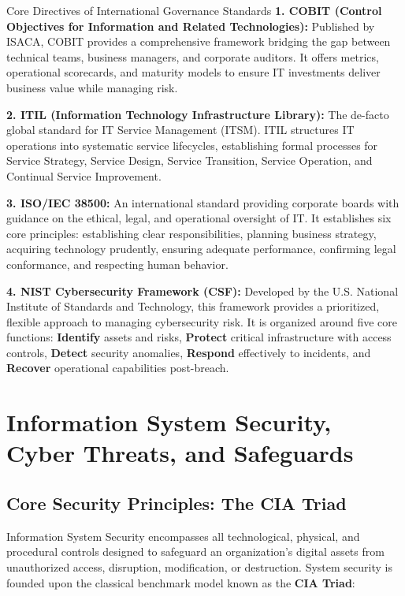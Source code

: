 \documentclass[11pt,a4paper]{article}
\begin{document}
\begin{governancebox}{Core Directives of International Governance Standards}
\textbf{1. COBIT (Control Objectives for Information and Related Technologies):} Published by ISACA, COBIT provides a comprehensive framework bridging the gap between technical teams, business managers, and corporate auditors. It offers metrics, operational scorecards, and maturity models to ensure IT investments deliver business value while managing risk.

\textbf{2. ITIL (Information Technology Infrastructure Library):} The de-facto global standard for IT Service Management (ITSM). ITIL structures IT operations into systematic service lifecycles, establishing formal processes for Service Strategy, Service Design, Service Transition, Service Operation, and Continual Service Improvement.

\textbf{3. ISO/IEC 38500:} An international standard providing corporate boards with guidance on the ethical, legal, and operational oversight of IT. It establishes six core principles: establishing clear responsibilities, planning business strategy, acquiring technology prudently, ensuring adequate performance, confirming legal conformance, and respecting human behavior.

\textbf{4. NIST Cybersecurity Framework (CSF):} Developed by the U.S. National Institute of Standards and Technology, this framework provides a prioritized, flexible approach to managing cybersecurity risk. It is organized around five core functions: \textbf{Identify} assets and risks, \textbf{Protect} critical infrastructure with access controls, \textbf{Detect} security anomalies, \textbf{Respond} effectively to incidents, and \textbf{Recover} operational capabilities post-breach.
\end{governancebox}

\section[Information System Security]{Information System Security, Cyber Threats, and Safeguards}
\label{sec:security}

\subsection{Core Security Principles: The CIA Triad}
Information System Security encompasses all technological, physical, and procedural controls designed to safeguard an organization's digital assets from unauthorized access, disruption, modification, or destruction. System security is founded upon the classical benchmark model known as the \textbf{CIA Triad}:
\end{document}
